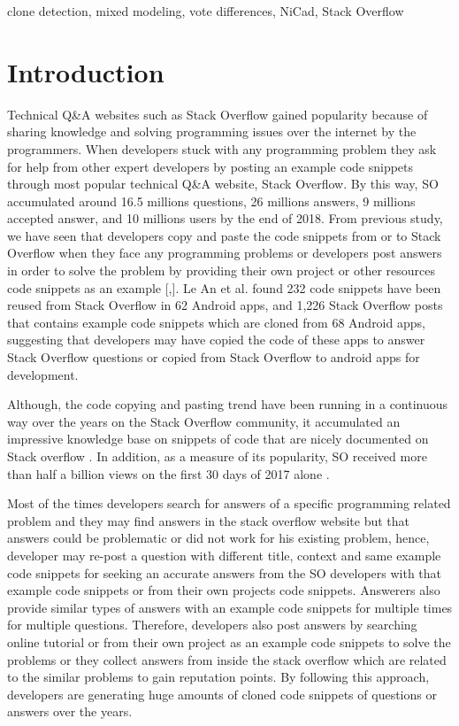 \documentclass[conference]{IEEEtran}
\begin{document}
	\begin{IEEEkeywords}
		clone detection, mixed modeling, vote differences, NiCad, Stack Overflow
	\end{IEEEkeywords}
	
	\section{Introduction} \label{intro}
	Technical Q\&A websites such as Stack Overflow  gained popularity because of sharing knowledge and solving programming issues over the internet by the programmers. When developers stuck with any programming problem they ask for help from other expert developers by posting an example code snippets through most popular technical Q\&A website, Stack Overflow. By this way, SO accumulated around 16.5 millions questions, 26 millions answers, 9 millions accepted answer, and 10 millions users by the end of 2018. 
	From previous study, we have seen that developers copy and paste the code snippets from or to Stack Overflow when they face any programming problems or developers post answers in order to solve the problem by providing their own project or other resources code snippets as an example [,]. Le An et al. found 232 code snippets have been reused from Stack Overflow in 62 Android apps, and 1,226 Stack Overflow posts that contains example code snippets which are cloned from 68 Android apps, suggesting that developers may have copied the code of these apps to answer Stack Overflow questions \cite{b5} or copied from Stack Overflow to android apps for development.
	
	Although, the code copying and pasting trend have been running in a continuous way over the years on the Stack Overflow community, it accumulated an impressive knowledge base on snippets of code that are nicely documented on Stack overflow \cite{b3}. In addition, as a measure of its popularity, SO received more than half a billion views on the first 30 days of 2017 alone \cite{b4}. 
	
	Most of the times developers search for answers of a specific programming related problem and they may find answers in the stack overflow website but that answers could be problematic or did not work for his existing problem, hence, developer may re-post a question with different title, context and same example code snippets for seeking an accurate answers from the SO developers with that example code snippets or from their own projects code snippets. Answerers also provide similar types of answers with an example code snippets for multiple times for multiple questions. Therefore, developers also post answers by searching online tutorial or from their own project as an example code snippets to solve the problems or they collect answers from inside the stack overflow which are related to the similar problems to gain reputation points. By following this approach, developers are generating huge amounts of cloned code snippets of questions or answers over the years. 
	
\end{document}
